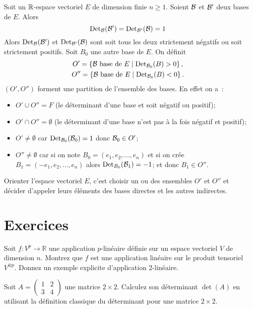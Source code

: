 Soit un \(\mathbb{R}\)-espace vectoriel \(E\) de dimension finie \(n\geqslant 
1\). Soient \(\mathcal{B}\) et \(\mathcal{B}'\) deux bases de \(E\). Alors
\begin{equation}
  \operatorname{Det}_{\mathcal{B}}(\mathcal{B}') =  \operatorname{Det}_{\mathcal{B}'}(\mathcal{B}) = 1
\end{equation}
Alors \(\operatorname{Det}_{\mathcal{B}}(\mathcal{B}')\) et \(\operatorname{Det}_{\mathcal{B}'}(\mathcal{B})\) sont soit tous les deux 
strictement négatifs ou soit strictement positifs. Soit \(B_0\) une 
autre base de \(E\). On définit
\begin{gather}
  O'=\left\{\mathcal{B} \text{~base de~} E\mathrel{}\middle|\mathrel{}\operatorname{Det}_{\mathcal{B}_0}(B)>0\right\},\\
  O''=\left\{\mathcal{B} \text{~base de~} E\mathrel{}\middle|\mathrel{}\operatorname{Det}_{\mathcal{B}_0}(B)<0\right\}.
\end{gather}
\((O',O'')\) forment une partition de l'ensemble des bases. En effet on 
a~:
\begin{itemize}
  \item \(O' \cup O'' = F\) (le déterminant d'une base et soit négatif 
    ou positif);
  \item \(O' \cap O'' = \emptyset\) (le déterminant d'une base n'est pas 
    à la fois négatif et positif);
  \item \(O' \neq \emptyset\) car \(\operatorname{Det}_{\mathcal{B}_0}(\mathcal{B}_0)=1\) donc \(\mathcal{B}_0 
    \in O'\);
  \item \(O'' \neq \emptyset\)  car si on note \(B_0=(e_1, e_2, \ldots, 
    e_n)\) et si on crée \(B_1 = (-e_1, e_2, \ldots, e_n)\) alors 
    \(\operatorname{Det}_{B_0}(\mathcal{B}_1) = -1\); et donc \(B_1 \in O''\).
\end{itemize}

\begin{defdef}
  Orienter l'espace vectoriel \(E\), c'est choisir un ou des ensembles 
  \(O'\) et \(O''\) et décider d'appeler leurs éléments des bases 
  directes et les autres indirectes.
\end{defdef}
\section{Exercices}
\begin{exercice}
Soit \( f : V^p \to \mathbb{R} \) une application \( p \)-linéaire définie sur un espace vectoriel \( V \) de dimension \( n \). Montrez que \( f \) est une application linéaire sur le produit tensoriel \( V^{\otimes p} \). Donnez un exemple explicite d'application 2-linéaire.
\end{exercice}

\begin{exercice}
Soit \( A = \begin{pmatrix} 1 & 2 \\ 3 & 4 \end{pmatrix} \) une matrice \( 2 \times 2 \). Calculez son déterminant \( \det(A) \) en utilisant la définition classique du déterminant pour une matrice \( 2 \times 2 \).
\end{exercice}

